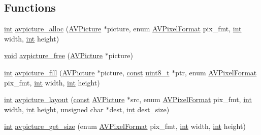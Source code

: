 \subsection*{Functions}
\begin{DoxyCompactItemize}
\item 
\hyperlink{xmltok_8h_a5a0d4a5641ce434f1d23533f2b2e6653}{int} \hyperlink{group__lavc__picture_ga03b764a93c34d00e5a33a5ebb0b4a81b}{avpicture\+\_\+alloc} (\hyperlink{struct_a_v_picture}{A\+V\+Picture} $\ast$picture, enum \hyperlink{pixfmt_8h_a9a8e335cf3be472042bc9f0cf80cd4c5}{A\+V\+Pixel\+Format} pix\+\_\+fmt, \hyperlink{xmltok_8h_a5a0d4a5641ce434f1d23533f2b2e6653}{int} width, \hyperlink{xmltok_8h_a5a0d4a5641ce434f1d23533f2b2e6653}{int} height)
\item 
\hyperlink{sound_8c_ae35f5844602719cf66324f4de2a658b3}{void} \hyperlink{group__lavc__picture_gaf4ad71a7e39b54ee70f18cc451de956f}{avpicture\+\_\+free} (\hyperlink{struct_a_v_picture}{A\+V\+Picture} $\ast$picture)
\item 
\hyperlink{xmltok_8h_a5a0d4a5641ce434f1d23533f2b2e6653}{int} \hyperlink{group__lavc__picture_gac1b22e9b246cb8b0928cca8f5fa524d4}{avpicture\+\_\+fill} (\hyperlink{struct_a_v_picture}{A\+V\+Picture} $\ast$picture, \hyperlink{getopt1_8c_a2c212835823e3c54a8ab6d95c652660e}{const} \hyperlink{lib-src_2ffmpeg_2win32_2stdint_8h_a9a941819355e6f658991890ff66b4b0e}{uint8\+\_\+t} $\ast$ptr, enum \hyperlink{pixfmt_8h_a9a8e335cf3be472042bc9f0cf80cd4c5}{A\+V\+Pixel\+Format} pix\+\_\+fmt, \hyperlink{xmltok_8h_a5a0d4a5641ce434f1d23533f2b2e6653}{int} width, \hyperlink{xmltok_8h_a5a0d4a5641ce434f1d23533f2b2e6653}{int} height)
\item 
\hyperlink{xmltok_8h_a5a0d4a5641ce434f1d23533f2b2e6653}{int} \hyperlink{group__lavc__picture_ga99bc554a84681f7ee6422a384007a4ca}{avpicture\+\_\+layout} (\hyperlink{getopt1_8c_a2c212835823e3c54a8ab6d95c652660e}{const} \hyperlink{struct_a_v_picture}{A\+V\+Picture} $\ast$src, enum \hyperlink{pixfmt_8h_a9a8e335cf3be472042bc9f0cf80cd4c5}{A\+V\+Pixel\+Format} pix\+\_\+fmt, \hyperlink{xmltok_8h_a5a0d4a5641ce434f1d23533f2b2e6653}{int} width, \hyperlink{xmltok_8h_a5a0d4a5641ce434f1d23533f2b2e6653}{int} height, unsigned char $\ast$dest, \hyperlink{xmltok_8h_a5a0d4a5641ce434f1d23533f2b2e6653}{int} dest\+\_\+size)
\item 
\hyperlink{xmltok_8h_a5a0d4a5641ce434f1d23533f2b2e6653}{int} \hyperlink{group__lavc__picture_ga18a08bcb237767ef442fd5d3d1dd2084}{avpicture\+\_\+get\+\_\+size} (enum \hyperlink{pixfmt_8h_a9a8e335cf3be472042bc9f0cf80cd4c5}{A\+V\+Pixel\+Format} pix\+\_\+fmt, \hyperlink{xmltok_8h_a5a0d4a5641ce434f1d23533f2b2e6653}{int} width, \hyperlink{xmltok_8h_a5a0d4a5641ce434f1d23533f2b2e6653}{int} height)

\end{DoxyCompactItemize}
